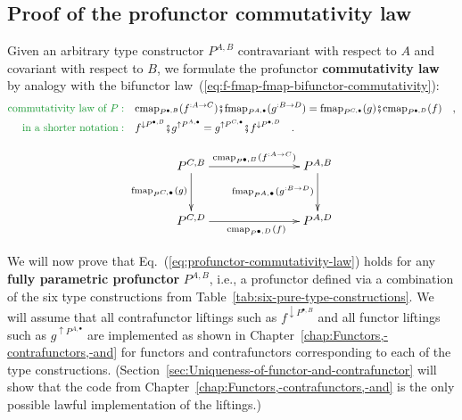 \subsection{Proof of the profunctor commutativity law\label{subsec:Proof-of-the-profunctor-commutativity-law}}

Given an arbitrary type constructor $P^{A,B}$ contravariant with
respect to $A$ and covariant with respect to $B$, we formulate the
profunctor \textbf{commutativity law}
by analogy with the bifunctor law~(\ref{eq:f-fmap-fmap-bifunctor-commutativity}):
\begin{align}
{\color{greenunder}\text{commutativity law of }P:}\quad & \text{cmap}_{P^{\bullet,B}}(f^{:A\rightarrow C})\bef\text{fmap}_{P^{A,\bullet}}(g^{:B\rightarrow D})=\text{fmap}_{P^{C,\bullet}}(g)\bef\text{cmap}_{P^{\bullet,D}}(f)\quad,\nonumber \\
{\color{greenunder}\text{in a shorter notation}:}\quad & f^{\downarrow P^{\bullet,B}}\bef g^{\uparrow P^{A,\bullet}}=g^{\uparrow P^{C,\bullet}}\bef f^{\downarrow P^{\bullet,D}}\quad.\label{eq:profunctor-commutativity-law}
\end{align}

\begin{wrapfigure}{l}{0.38\columnwidth}%
\vspace{-1.7\baselineskip}
\[
\xymatrix{\xyScaleY{2.5pc}\xyScaleX{6.0pc}P^{C,B}\ar[r]\sp(0.55){\text{cmap}_{P^{\bullet,B}}(f^{:A\rightarrow C})~~~}\ar[d]\sb(0.45){\text{fmap}_{P^{C,\bullet}}(g)} & P^{A,B}\ar[d]\sb(0.45){\text{fmap}_{P^{A,\bullet}}(g^{:B\rightarrow D})}\\
P^{C,D}\ar[r]\sb(0.45){~~~~\text{cmap}_{P^{\bullet,D}}(f)} & P^{A,D}
}
\]

\vspace{-1.7\baselineskip}
\end{wrapfigure}%

We will now prove that Eq.~(\ref{eq:profunctor-commutativity-law})
holds for any \textbf{fully parametric profunctor}
$P^{A,B}$, i.e., a profunctor defined via a combination of the six
type constructions from Table~\ref{tab:six-pure-type-constructions}.
We will assume that all contrafunctor liftings such as $f^{\downarrow P^{\bullet,B}}$
and all functor liftings such as $g^{\uparrow P^{A,\bullet}}$ are
implemented as shown in Chapter~\ref{chap:Functors,-contrafunctors,-and}
for functors and contrafunctors corresponding to each of the type
constructions. (Section~\ref{sec:Uniqueness-of-functor-and-contrafunctor}
will show that the code from Chapter~\ref{chap:Functors,-contrafunctors,-and}
is the only possible lawful implementation of the liftings.)

